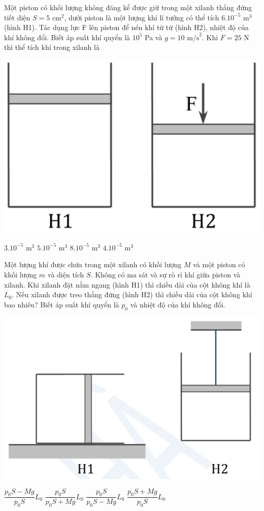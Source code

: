 \documentclass[12pt,a4paper]{article}
\begin{document}
\begin{multicols}{2}
	\begin{ex}
		Một piston có khối lượng không đáng kể được giữ trong một xilanh thẳng đứng tiết diện $S = 5 \text{ cm}^2$, dưới piston là một lượng khí lí tưởng có thể tích $6.10^{-5} \text{ m}^3$ (hình H1). Tác dụng lực F lên piston để nén khí từ từ (hình H2), nhiệt độ của khí không đổi. Biết áp suất khí quyển là $10^5$ Pa và $g = 10 \text{ m/s}^2$. Khi $F = 25$ N thì thể tích khí trong xilanh là
			\begin{center}
			\includegraphics[scale=0.3]{img/3.png}
		\end{center}
		\choice
		{$3.10^{-5} \text{ m}^3$}
		{$5.10^{-5} \text{ m}^3$}
		{$8.10^{-5} \text{ m}^3$}
		{$4.10^{-5} \text{ m}^3$}
	\end{ex}
	
	\begin{ex}
		Một lượng khí được chứa trong một xilanh có khối lượng $M$ và một piston có khối lượng $m$ và diện tích $S$. Không có ma sát và sự rò rỉ khí giữa piston và xilanh. Khi xilanh đặt nằm ngang (hình H1) thì chiều dài của cột không khí là $L_0$. Nếu xilanh được treo thẳng đứng (hình H2) thì chiều dài của cột không khí bao nhiêu? Biết áp suất khí quyển là $p_0$ và nhiệt độ của khí không đổi.
			\begin{center}
			\includegraphics[scale=0.3]{img/4.png}
		\end{center}
		\choice
		{$\dfrac{p_0S-Mg}{p_0S}L_0$}
		{$\dfrac{p_0S}{p_0S+Mg}L_0$}
		{$\dfrac{p_0S}{p_0S-Mg}L_0$}
		{$\dfrac{p_0S+Mg}{p_0S}L_0$}
	\end{ex}
	

\end{multicols}
\end{document}
